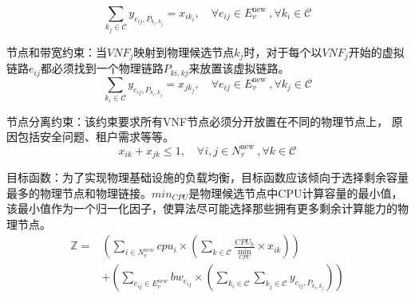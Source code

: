 \begin{equation}
    \sum_{k_{j} \in \mathcal{C}} y_{e_{i j}, P_{k_{i}, k_{j}}}=x_{i k_{i}},\quad \forall e_{i j} \in E_{v}^{\text {new }}, \forall k_{i} \in \mathcal{C}
\end{equation}\par
节点和带宽约束：当$VNF_j$映射到物理候选节点$k_j$时，对于每个以$VNF_j$开始的虚拟链路$e_{ij}$都必须找到一个物理链路$P_{ki,kj}$来放置该虚拟链路。
\begin{equation}
    \sum_{k_{i} \in \mathcal{C}} y_{e_{i j}, P_{k_{i}, k_{j}}}=x_{j k_{j}},\quad \forall e_{i j} \in E_{v}^{\text {new }}, \forall k_{j} \in \mathcal{C}
\end{equation}\par
节点分离约束：该约束要求所有VNF节点必须分开放置在不同的物理节点上， 原因包括安全问题、租户需求等等。
\begin{equation}
    x_{i k}+x_{j k} \leq 1,\quad \forall i, j \in N_{v}^{\text {new }}, \forall k \in \mathcal{C}
\end{equation}\par
目标函数：为了实现物理基础设施的负载均衡，目标函数应该倾向于选择剩余容量最多的物理节点和物理链接。$min_{CPU}$是物理候选节点中CPU计算容量的最小值，该最小值作为一个归一化因子，使算法尽可能选择那些拥有更多剩余计算能力的物理节点。
\begin{equation}
    \begin{aligned}
        \mathbb{Z}=&\left(\sum_{i \in N_{v}^{n e w}} c p u_{i} \times\left(\sum_{k \in \mathcal{C}} \frac{C P U_{k}}{\min _{C P U}} \times x_{i k}\right)\right) \\
        &+\left(\sum_{e_{i j} \in E_{v}^{n e w}} b w_{e_{i j}} \times\left(\sum_{k_{i} \in \mathcal{C}} \sum_{k_{j} \in \mathcal{C}} y_{e_{i j}, P_{k_{i}, k_{j}}}\right)\right)
    \end{aligned}
\end{equation}\par

   
